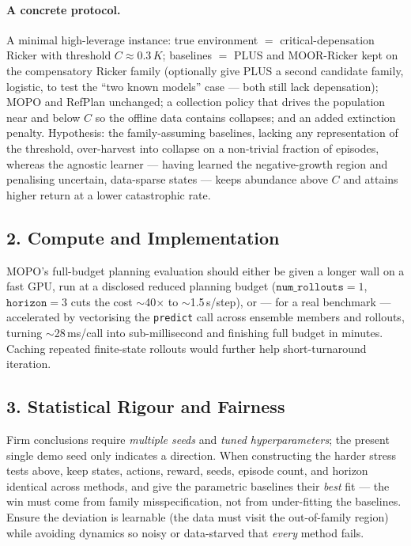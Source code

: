 \documentclass[11pt]{article}
\begin{document}
\paragraph{A concrete protocol.}
A minimal high-leverage instance: true environment $=$ critical-depensation Ricker
with threshold $C \approx 0.3\,K$; baselines $=$ PLUS and MOOR-Ricker kept on the
compensatory Ricker family (optionally give PLUS a second candidate family,
logistic, to test the ``two known models'' case --- both still lack depensation);
MOPO and RefPlan unchanged; a collection policy that drives the population near and
below $C$ so the offline data contains collapses; and an added extinction penalty.
Hypothesis: the family-assuming baselines, lacking any representation of the
threshold, over-harvest into collapse on a non-trivial fraction of episodes,
whereas the agnostic learner --- having learned the negative-growth region and
penalising uncertain, data-sparse states --- keeps abundance above $C$ and attains
higher return at a lower catastrophic rate.

\subsection*{2. Compute and Implementation}
MOPO's full-budget planning evaluation should either be given a longer wall on a
fast GPU, run at a disclosed reduced planning budget
($\texttt{num\_rollouts}=1$, $\texttt{horizon}=3$ cuts the cost $\sim$40$\times$ to
$\sim$1.5\,s/step), or --- for a real benchmark --- accelerated by vectorising the
\texttt{predict} call across ensemble members and rollouts, turning
$\sim$28\,ms/call into sub-millisecond and finishing full budget in minutes.
Caching repeated finite-state rollouts would further help short-turnaround
iteration.

\subsection*{3. Statistical Rigour and Fairness}
Firm conclusions require \emph{multiple seeds} and \emph{tuned hyperparameters};
the present single demo seed only indicates a direction. When constructing the
harder stress tests above, keep states, actions, reward, seeds, episode count, and
horizon identical across methods, and give the parametric baselines their
\emph{best} fit --- the win must come from family misspecification, not from
under-fitting the baselines. Ensure the deviation is learnable (the data must visit
the out-of-family region) while avoiding dynamics so noisy or data-starved that
\emph{every} method fails.
\end{document}
